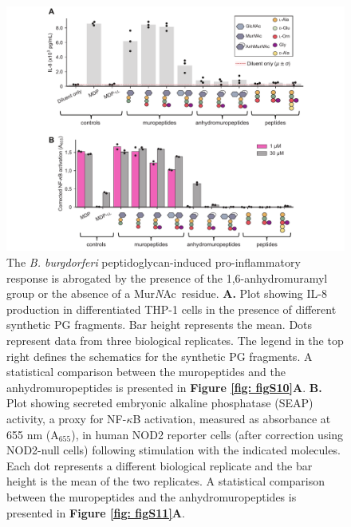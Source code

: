 \documentclass[twoside, watermark]{zHenriquesLab-StyleBioRxiv}
\newcommand{\NAM}{Mur\textit{N}Ac}
\begin{document}
\begin{figure}
    \centering
    \includegraphics[width=\textwidth]{Figures/Figure_5_Host_Response_to_Bb_Sup.pdf}
    \caption{The \textit{B. burgdorferi} peptidoglycan-induced pro-inflammatory response is abrogated by the presence of the 1,6-anhydromuramyl group or the absence of a \NAM~residue. \textbf{A.} Plot showing IL-8 production in differentiated THP-1 cells in the presence of different synthetic PG fragments. Bar height represents the mean. Dots represent data from three biological replicates. The legend in the top right defines the schematics for the synthetic PG fragments. A statistical comparison between the muropeptides and the anhydromuropeptides is presented in \textbf{Figure \ref{fig: figS10}A}. \textbf{B.} Plot showing secreted embryonic alkaline phosphatase (SEAP) activity, a proxy for NF-$\kappa$B activation, measured as absorbance at 655 nm (A$_\text{655}$), in human NOD2 reporter cells (after correction using NOD2-null cells) following stimulation with the indicated molecules.  Each dot represents a different biological replicate and the bar height is the mean of the two replicates. A statistical comparison between the muropeptides and the anhydromuropeptides is presented in \textbf{Figure \ref{fig: figS11}A}.}
    \label{fig: fig5}
\end{figure}
\end{document}
